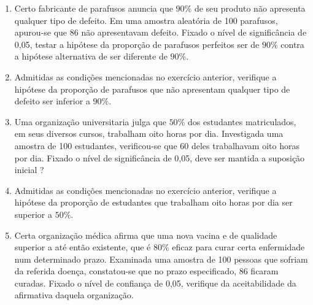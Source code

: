 \begin{enumerate}[resume]
\item Certo fabricante de parafusos anuncia que $90\%$ de seu produto não apresenta qualquer tipo de defeito. Em uma amostra aleatória de 100 parafusos, apurou-se que 86 não apresentavam defeito. Fixado o nível de significância de 0,05, testar a hipótese da proporção de parafusos perfeitos ser de $90\%$ contra a hipótese alternativa de ser diferente de $90\%$.

\item Admitidas as condições mencionadas no exercício anterior, verifique a hipótese da proporção de parafusos que não apresentam qualquer tipo de defeito ser inferior a $90\%$. 

\item Uma organização universitaria julga que $50\%$ dos estudantes matriculados, em seus diversos cursos, trabalham oito horas por dia. Investigada uma amostra de 100 estudantes, verificou-se que 60 deles trabalhavam oito horas por dia. Fixado o nível de significância de 0,05, deve ser mantida a suposição inicial ? 

\item Admitidas as condições mencionadas no exercício anterior, verifique a hipótese da proporção de estudantes que trabalham oito horas por dia ser superior a $50\%$.

\item Certa organização médica afirma que uma nova vacina e de qualidade superior a até então existente, que é $80\%$ eficaz para curar certa enfermidade num determinado prazo. Examinada uma amostra de 100 pessoas que sofriam da referida doença, constatou-se que no prazo especificado, 86 ficaram curadas. Fixado o nível de confiança de 0,05, verifique da aceitabilidade da afirmativa daquela organização.

\end{enumerate}